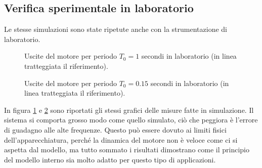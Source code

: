 		
		
		
		
		
		
	\subsection{Verifica sperimentale in laboratorio}	
	\label{subsec:lab7}	
	
		Le stesse simulazioni sono state ripetute anche con la strumentazione di laboratorio.
	
		\begin{figure}[H]
			\centering
			
			\caption{Uscite del motore per periodo $T_0=1$ secondi in laboratorio (in linea tratteggiata il riferimento).} 
			\label{fig:labLowerBound}		
		\end{figure}		 
		
		\begin{figure}[H]
			\centering
			 
			\caption{Uscite del motore per periodo $T_0=0.15$ secondi in laboratorio (in linea tratteggiata il riferimento).}
			\label{fig:labUpperBound}		
		\end{figure}
		
		\noindent In figura \ref{fig:labLowerBound} e \ref{fig:labUpperBound} sono riportati gli stessi grafici delle misure fatte in simulazione. Il sistema si comporta grosso modo come quello simulato, ciò che peggiora è l'errore di guadagno alle alte frequenze. Questo può essere dovuto ai limiti fisici dell'apparecchiatura, perché la dinamica del motore non è veloce come ci si aspetta dal modello, ma tutto sommato i risultati dimostrano come il principio del modello interno sia molto adatto per questo tipo di applicazioni.	
	
	